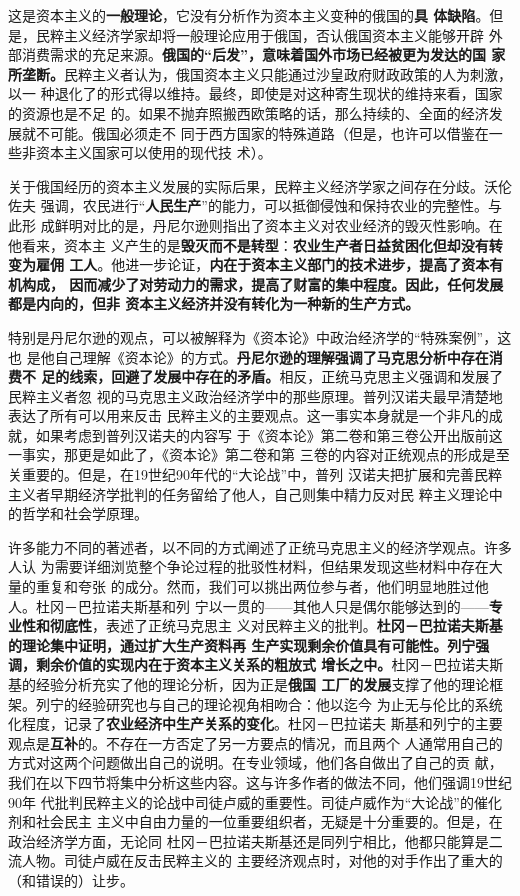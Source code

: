 这是资本主义的\textbf{一般理论}，它没有分析作为资本主义变种的俄国的\textbf{具
  体缺陷}。但是，民粹主义经济学家却将一般理论应用于俄国，否认俄国资本主义能够开辟
外部消费需求的充足来源。\textbf{俄国的“后发”，意味着国外市场已经被更为发达的国
  家所垄断。}民粹主义者认为，俄国资本主义只能通过沙皇政府财政政策的人为刺激，以一
种退化了的形式得以维持。最终，即使是对这种寄生现状的维持来看，国家的资源也是不足
的。如果不抛弃照搬西欧策略的话，那么持续的、全面的经济发展就不可能。俄国必须走不
同于西方国家的特殊道路（但是，也许可以借鉴在一些非资本主义国家可以使用的现代技
术）。

关于俄国经历的资本主义发展的实际后果，民粹主义经济学家之间存在分歧。沃伦佐夫
强调，农民进行“\textbf{人民生产}”的能力，可以抵御侵蚀和保持农业的完整性。与此形
成鲜明对比的是，丹尼尔逊则指出了资本主义对农业经济的毁灭性影响。在他看来，资本主
义产生的是\textbf{毁灭而不是转型}：\textbf{农业生产者日益贫困化但却没有转变为雇佣
  工人}。他进一步论证，\textbf{内在于资本主义部门的技术进步，提高了资本有机构成，
  因而减少了对劳动力的需求，提高了财富的集中程度。因此，任何发展都是内向的，但非
  资本主义经济并没有转化为一种新的生产方式。}

特别是丹尼尔逊的观点，可以被解释为《资本论》中政治经济学的“特殊案例”，这也
是他自己理解《资本论》的方式。\textbf{丹尼尔逊的理解强调了马克思分析中存在消费不
  足的线索，回避了发展中存在的矛盾。}相反，正统马克思主义强调和发展了民粹主义者忽
视的马克思主义政治经济学中的那些原理。普列汉诺夫最早清楚地表达了所有可以用来反击
民粹主义的主要观点。这一事实本身就是一个非凡的成就，如果考虑到普列汉诺夫的内容写
于《资本论》第二卷和第三卷公开出版前这一事实，那更是如此了，《资本论》第二卷和第
三卷的内容对正统观点的形成是至关重要的。但是，在19世纪90年代的“大论战”中，普列
汉诺夫把扩展和完善民粹主义者早期经济学批判的任务留给了他人，自己则集中精力反对民
粹主义理论中的哲学和社会学原理。

许多能力不同的著述者，以不同的方式阐述了正统马克思主义的经济学观点。许多人认
为需要详细浏览整个争论过程的批驳性材料，但结果发现这些材料中存在大量的重复和夸张
的成分。然而，我们可以挑出两位参与者，他们明显地胜过他人。杜冈－巴拉诺夫斯基和列
宁以一贯的——其他人只是偶尔能够达到的——\textbf{专业性和彻底性}，表述了正统马克思主
义对民粹主义的批判。\textbf{杜冈－巴拉诺夫斯基的理论集中证明，通过扩大生产资料再
  生产实现剩余价值具有可能性。列宁强调，剩余价值的实现内在于资本主义关系的粗放式
  增长之中。}杜冈－巴拉诺夫斯基的经验分析充实了他的理论分析，因为正是\textbf{俄国
  工厂的发展}支撑了他的理论框架。列宁的经验研究也与自己的理论视角相吻合：他以迄今
为止无与伦比的系统化程度，记录了\textbf{农业经济中生产关系的变化}。杜冈－巴拉诺夫
斯基和列宁的主要观点是\textbf{互补}的。不存在一方否定了另一方要点的情况，而且两个
人通常用自己的方式对这两个问题做出自己的说明。在专业领域，他们各自做出了自己的贡
献，我们在以下四节将集中分析这些内容。这与许多作者的做法不同，他们强调19世纪90年
代批判民粹主义的论战中司徒卢威的重要性。司徒卢威作为“大论战”的催化剂和社会民主
主义中自由力量的一位重要组织者，无疑是十分重要的。但是，在政治经济学方面，无论同
杜冈－巴拉诺夫斯基还是同列宁相比，他都只能算是二流人物。司徒卢威在反击民粹主义的
主要经济观点时，对他的对手作出了重大的（和错误的）让步。

